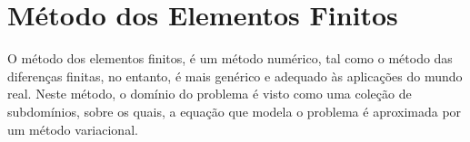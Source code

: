\section{Método dos Elementos Finitos}

O método dos elementos finitos, é um método numérico, tal como o método das diferenças finitas, no entanto, é mais genérico e adequado às aplicações do mundo real. Neste método, o domínio do problema é visto como uma coleção de subdomínios, sobre os quais, a equação que modela o problema é aproximada por um método variacional.
\citep[p. 13]{reddy}


